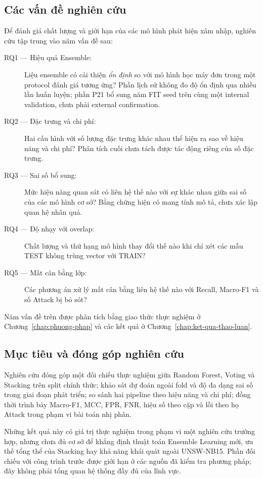 \subsection{Các vấn đề nghiên cứu}
Để đánh giá chất lượng và giới hạn của các mô hình phát hiện xâm nhập, nghiên cứu tập trung vào năm vấn đề sau:

\begin{description}
\item[RQ1 --- Hiệu quả Ensemble:] Liệu ensemble có cải thiện \emph{ổn định} so với mô hình học máy đơn trong một protocol đánh giá tương ứng? Phần lịch sử không đo độ ổn định qua nhiều lần huấn luyện; phần P21 bổ sung năm FIT seed trên cùng một internal validation, chưa phải external confirmation.
\item[RQ2 --- Đặc trưng và chi phí:] Hai cấu hình với số lượng đặc trưng khác nhau thể hiện ra sao về hiệu năng và chi phí? Phân tích cuối chưa tách được tác động riêng của số đặc trưng.
\item[RQ3 --- Sai số bổ sung:] Mức hiệu năng quan sát có liên hệ thế nào với sự khác nhau giữa sai số của các mô hình cơ sở? Bằng chứng hiện có mang tính mô tả, chưa xác lập quan hệ nhân quả.
\item[RQ4 --- Độ nhạy với overlap:] Chất lượng và thứ hạng mô hình thay đổi thế nào khi chỉ xét các mẫu TEST không trùng vector với TRAIN?
\item[RQ5 --- Mất cân bằng lớp:] Các phương án xử lý mất cân bằng liên hệ thế nào với Recall, Macro-F1 và số Attack bị bỏ sót?
\end{description}

Năm vấn đề trên được phân tích bằng giao thức thực nghiệm ở Chương~\ref{chap:phuong-phap} và các kết quả ở Chương~\ref{chap:ket-qua-thao-luan}.

\subsection{Mục tiêu và đóng góp nghiên cứu}
Nghiên cứu đóng góp một đối chiếu thực nghiệm giữa Random Forest, Voting và Stacking trên split chính thức; khảo sát dự đoán ngoài fold và độ đa dạng sai số trong giai đoạn phát triển; so sánh hai pipeline theo hiệu năng và chi phí; đồng thời trình bày Macro-F1, MCC, FPR, FNR, hiệu số theo cặp và lỗi theo họ Attack trong phạm vi bài toán nhị phân.

Những kết quả này có giá trị thực nghiệm trong phạm vi một nghiên cứu trường hợp, nhưng chưa đủ cơ sở để khẳng định thuật toán Ensemble Learning mới, ưu thế tổng thể của Stacking hay khả năng khái quát ngoài UNSW-NB15. Phần đối chiếu với công trình trước được giới hạn ở các nguồn đã kiểm tra phương pháp; đây không phải tổng quan hệ thống đầy đủ của lĩnh vực.

